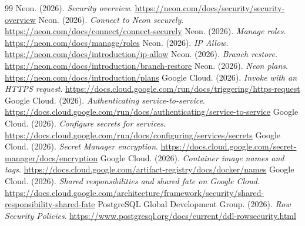 \documentclass[10pt,letterpaper]{article}
\begin{document}
\begin{thebibliography}{99}
\setlength{\itemsep}{0pt}\footnotesize
{} Neon. (2026). \emph{Security overview}. \url{https://neon.com/docs/security/security-overview}
 Neon. (2026). \emph{Connect to Neon securely}. \url{https://neon.com/docs/connect/connect-securely}
 Neon. (2026). \emph{Manage roles}. \url{https://neon.com/docs/manage/roles}
 Neon. (2026). \emph{IP Allow}. \url{https://neon.com/docs/introduction/ip-allow}
 Neon. (2026). \emph{Branch restore}. \url{https://neon.com/docs/introduction/branch-restore}
 Neon. (2026). \emph{Neon plans}. \url{https://neon.com/docs/introduction/plans}
 Google Cloud. (2026). \emph{Invoke with an HTTPS request}. \url{https://docs.cloud.google.com/run/docs/triggering/https-request}
 Google Cloud. (2026). \emph{Authenticating service-to-service}. \url{https://docs.cloud.google.com/run/docs/authenticating/service-to-service}
 Google Cloud. (2026). \emph{Configure secrets for services}. \url{https://docs.cloud.google.com/run/docs/configuring/services/secrets}
 Google Cloud. (2026). \emph{Secret Manager encryption}. \url{https://docs.cloud.google.com/secret-manager/docs/encryption}
 Google Cloud. (2026). \emph{Container image names and tags}. \url{https://docs.cloud.google.com/artifact-registry/docs/docker/names}
 Google Cloud. (2026). \emph{Shared responsibilities and shared fate on Google Cloud}. \url{https://docs.cloud.google.com/architecture/framework/security/shared-responsibility-shared-fate}
 PostgreSQL Global Development Group. (2026). \emph{Row Security Policies}. \url{https://www.postgresql.org/docs/current/ddl-rowsecurity.html}
\end{thebibliography}
\end{document}
